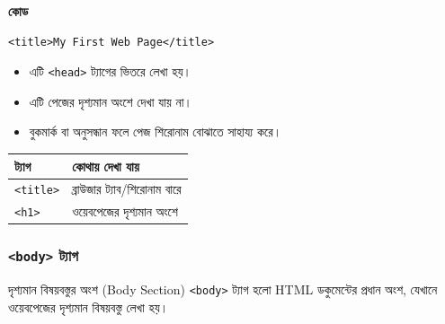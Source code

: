 \par\noindent
\begin{minipage}[t]{.50\linewidth}\vspace{0pt}\small
\textbf{\color{chFourTeal}কোড}\par
\begin{verbatim}
<title>My First Web Page</title>
\end{verbatim}

\par\smallskip
\end{minipage}\hfill
\begin{minipage}[t]{.46\linewidth}\vspace{0pt}\small
\begin{itemize}
\item এটি \texttt{<head>} ট্যাগের ভিতরে লেখা হয়।
\item এটি পেজের দৃশ্যমান অংশে দেখা যায় না।
\item বুকমার্ক বা অনুসন্ধান ফলে পেজ শিরোনাম বোঝাতে সাহায্য করে।
\end{itemize}
\end{minipage}\par


\begin{center}
\begin{tabular}{|p{}|p{}|}
\hline
\textbf{ট্যাগ} & \textbf{কোথায় দেখা যায়} \\
\hline
\texttt{<title>} & ব্রাউজার ট্যাব/শিরোনাম বারে \\
\hline
\texttt{<h1>} & ওয়েবপেজের দৃশ্যমান অংশে \\
\hline
\end{tabular}
\end{center}

\subsubsection{\texttt{<body>} ট্যাগ}

\begin{definitionbox}{দৃশ্যমান বিষয়বস্তুর অংশ (Body Section)}
\texttt{<body>} ট্যাগ হলো HTML ডকুমেন্টের প্রধান অংশ, যেখানে ওয়েবপেজের দৃশ্যমান বিষয়বস্তু লেখা হয়।
\end{definitionbox}

